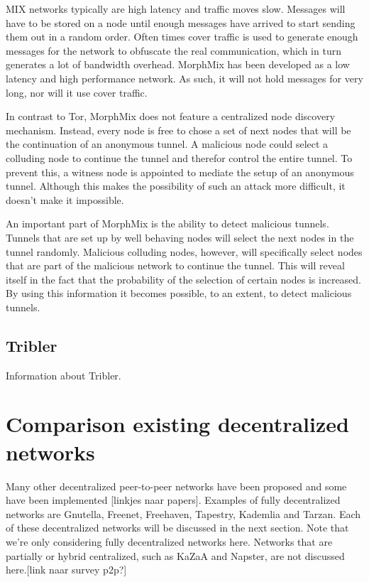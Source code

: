 \documentclass[journal]{IEEEtran}
\begin{document}
			MIX networks typically are high latency and traffic moves slow. Messages will have to be stored on a node until enough messages have arrived to start sending them out in a random order. Often times cover traffic is used to generate enough messages for the network to obfuscate the real communication, which in turn generates a lot of bandwidth overhead. MorphMix has been developed as a low latency and high performance network. As such, it will not hold messages for very long, nor will it use cover traffic.
			
			In contrast to Tor, MorphMix does not feature a centralized node discovery mechanism. Instead, every node is free to chose a set of next nodes that will be the continuation of an anonymous tunnel. A malicious node could select a colluding node to continue the tunnel and therefor control the entire tunnel. To prevent this, a witness node is appointed to mediate the setup of an anonymous tunnel. Although this makes the possibility of such an attack more difficult, it doesn't make it impossible.
			
			An important part of MorphMix is the ability to detect malicious tunnels. Tunnels that are set up by well behaving nodes will select the next nodes in the tunnel randomly. Malicious colluding nodes, however, will specifically select nodes that are part of the malicious network to continue the tunnel. This will reveal itself in the fact that the probability of the selection of certain nodes is increased. By using this information it becomes possible, to an extent, to detect malicious tunnels.
		
		\subsection{Tribler}
			Information about Tribler.


	\section{Comparison existing decentralized  networks}
Many other decentralized peer-to-peer networks have been proposed and some have been implemented [linkjes naar papers]. Examples of fully decentralized networks are Gnutella, Freenet, Freehaven, Tapestry, Kademlia and Tarzan. Each of these decentralized networks will be discussed in the next section. Note that we're only considering fully decentralized networks here. Networks that are partially or hybrid centralized, such as KaZaA and Napster, are not discussed here.[link naar survey p2p?]
\end{document}
